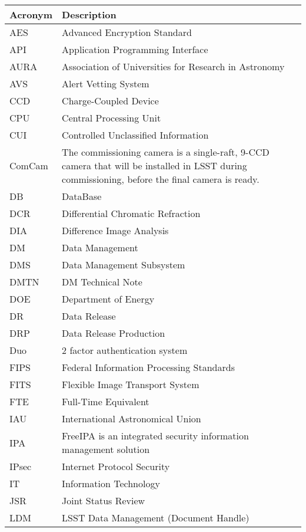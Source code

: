 \addtocounter{table}{-1}
\begin{longtable}{p{}p{}}\hline
\textbf{Acronym} & \textbf{Description}  \\\hline

AES & Advanced Encryption Standard \\\hline
API & Application Programming Interface \\\hline
AURA & Association of Universities for Research in Astronomy \\\hline
AVS & Alert Vetting System \\\hline
CCD & Charge-Coupled Device \\\hline
CPU & Central Processing Unit \\\hline
CUI & Controlled Unclassified Information \\\hline
ComCam & The commissioning camera is a single-raft, 9-CCD camera that will be installed in LSST during commissioning, before the final camera is ready. \\\hline
DB & DataBase \\\hline
DCR & Differential Chromatic Refraction \\\hline
DIA & Difference Image Analysis \\\hline
DM & Data Management \\\hline
DMS & Data Management Subsystem \\\hline
DMTN & DM Technical Note \\\hline
DOE & Department of Energy \\\hline
DR & Data Release \\\hline
DRP & Data Release Production \\\hline
Duo & 2 factor authentication system \\\hline
FIPS & Federal Information Processing Standards \\\hline
FITS & Flexible Image Transport System \\\hline
FTE & Full-Time Equivalent \\\hline
IAU & International Astronomical Union \\\hline
IPA & FreeIPA is an integrated security information management solution \\\hline
IPsec & Internet Protocol Security \\\hline
IT & Information Technology \\\hline
JSR & Joint Status Review \\\hline
LDM & LSST Data Management (Document Handle) \\\hline

\end{longtable}

